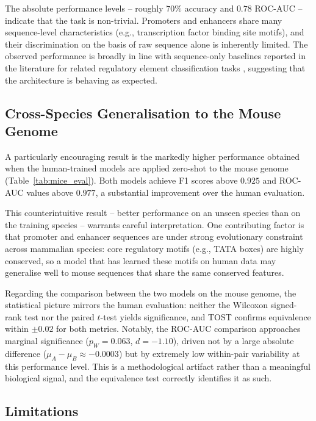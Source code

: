 \documentclass[11pt,a4paper,twoside]{article}
\begin{document}
The absolute performance levels -- roughly $70\%$ accuracy and $0.78$ ROC-AUC -- indicate that the task is non-trivial.
Promoters and enhancers share many sequence-level characteristics (e.g., transcription factor binding site motifs), and their discrimination on the basis of raw sequence alone is inherently limited.
The observed performance is broadly in line with sequence-only baselines reported in the literature for related regulatory element classification tasks \cite{dnabert}, suggesting that the architecture is behaving as expected.

\subsection{Cross-Species Generalisation to the Mouse Genome}

A particularly encouraging result is the markedly higher performance obtained when the human-trained models are applied zero-shot to the mouse genome (Table~\ref{tab:mice_eval}).
Both models achieve F1 scores above $0.925$ and ROC-AUC values above $0.977$, a substantial improvement over the human evaluation.

This counterintuitive result -- better performance on an unseen species than on the training species -- warrants careful interpretation.
One contributing factor is that promoter and enhancer sequences are under strong evolutionary constraint across mammalian species: core regulatory motifs (e.g., TATA boxes) are highly conserved, so a model that has learned these motifs on human data may generalise well to mouse sequences that share the same conserved features.

Regarding the comparison between the two models on the mouse genome, the statistical picture mirrors the human evaluation: neither the Wilcoxon signed-rank test nor the paired $t$-test yields significance, and TOST confirms equivalence within $\pm 0.02$ for both metrics.
Notably, the ROC-AUC comparison approaches marginal significance ($p_W = 0.063$, $d = -1.10$), driven not by a large absolute difference ($\mu_A - \mu_B \approx -0.0003$) but by extremely low within-pair variability at this performance level.
This is a methodological artifact rather than a meaningful biological signal, and the equivalence test correctly identifies it as such.

\subsection{Limitations}
\label{sec:limitations}
\end{document}
